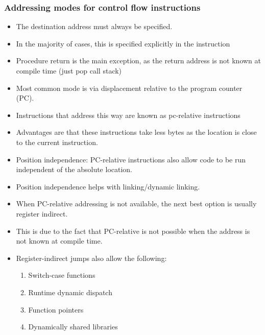 \documentclass[11pt, a4paper]{article}
\theoremstyle{definition}
\theoremstyle{remark}
\begin{document}
\subsubsection{Addressing modes for control flow instructions}
\begin{itemize}
  \item The destination address must always be specified.
  \item In the majority of cases, this is specified explicitly in the instruction
  \item Procedure return is the main exception, as the return address is not known at compile time (just pop call stack)
  \item Most common mode is via displacement relative to the program counter (PC). 
  \item Instructions that address this way are known as pc-relative instructions 
  \item Advantages are that these instructions take less bytes as the location is close to the current instruction.
  \item Position independence: PC-relative instructions also allow code to be run independent of the absolute location.
  \item Position independence helps with linking/dynamic linking.
  \item When PC-relative addressing is not available, the next best option is usually register indirect.
  \item This is due to the fact that PC-relative is not possible when the address is not known at compile time. 
  \item Register-indirect jumps also allow the following:
  \begin{enumerate}
    \item Switch-case functions
    \item Runtime dynamic dispatch
    \item Function pointers 
    \item Dynamically shared libraries
  \end{enumerate}
\end{itemize}
\end{document}
